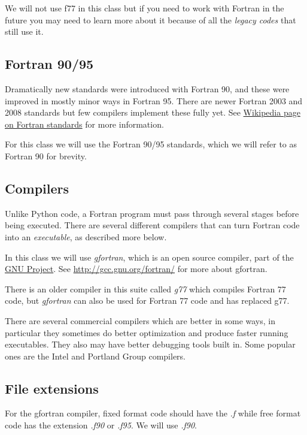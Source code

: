 \documentclass[letterpaper,10pt,english]{sphinxmanual}
\begin{document}
We will not use f77 in this class but if you need to work with
Fortran in the future you may need to learn more about it because of
all the \emph{legacy codes} that still use it.


\subsection{Fortran 90/95}
\label{fortran:fortran-90-95}
Dramatically new standards were introduced with Fortran 90, and these
were improved in mostly minor ways in Fortran 95.  There are newer
Fortran 2003 and 2008 standards but few compilers implement these fully yet.
See \href{http://gcc.gnu.org/wiki/GFortranStandards}{Wikipedia page on Fortran standards}
for more information.

For this class we will use the Fortran 90/95 standards, which we will
refer to as Fortran 90 for brevity.


\subsection{Compilers}
\label{fortran:fortran-compilers}\label{fortran:compilers}
Unlike Python code, a Fortran program must pass through several
stages before being executed.  There are several different compilers
that can turn Fortran code into an \emph{executable}, as described more
below.

In this class we will use \emph{gfortran}, which is an open source
compiler, part of the \href{http://www.gnu.org/}{GNU Project}.
See \href{http://gcc.gnu.org/fortran/}{http://gcc.gnu.org/fortran/} for more about gfortran.

There is an older compiler in this suite called \emph{g77} which
compiles Fortran 77 code, but \emph{gfortran} can also be used for Fortran
77 code and has replaced g77.

There are several commercial compilers which are better in some ways,
in particular they sometimes do better optimization and produce
faster running executables.  They also may have better debugging
tools built in.  Some popular ones are the Intel and Portland Group
compilers.


\subsection{File extensions}
\label{fortran:file-extensions}
For the gfortran compiler, fixed format code should have the
\emph{.f} while free format code has the extension \emph{.f90} or \emph{.f95}.  We
will use \emph{.f90}.
\end{document}
